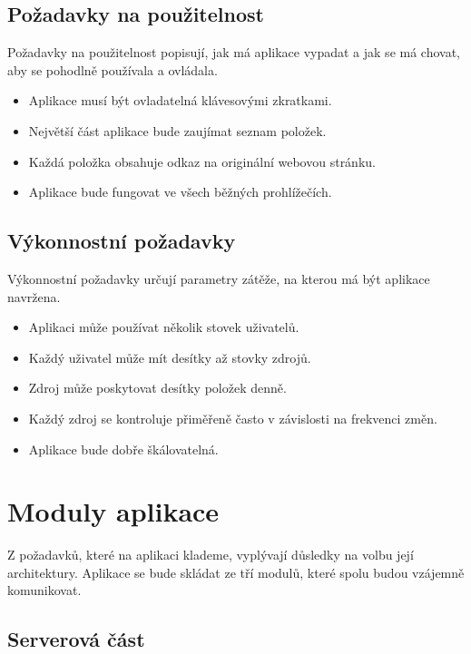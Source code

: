 \subsection{Požadavky na použitelnost}

Požadavky na použitelnost popisují, jak má aplikace vypadat a jak se má chovat, aby se pohodlně používala a ovládala.

\begin{itemize}
    \item Aplikace musí být ovladatelná klávesovými zkratkami.
    \item Největší část aplikace bude zaujímat seznam položek.
    \item Každá položka obsahuje odkaz na originální webovou stránku.
    \item Aplikace bude fungovat ve všech běžných prohlížečích.
\end{itemize}

\subsection{Výkonnostní požadavky}

Výkonnostní požadavky určují parametry zátěže, na kterou má být aplikace navržena.

\begin{itemize}
	\item Aplikaci může používat několik stovek uživatelů.
    \item Každý uživatel může mít desítky až stovky zdrojů.
	\item Zdroj může poskytovat desítky položek denně.
    \item Každý zdroj se kontroluje přiměřeně často v závislosti na frekvenci změn.
    \item Aplikace bude dobře škálovatelná.
\end{itemize}

\section{Moduly aplikace}

Z požadavků, které na aplikaci klademe, vyplývají důsledky na volbu její architektury.
Aplikace se bude skládat ze tří modulů, které spolu budou vzájemně komunikovat.

\subsection{Serverová část}

